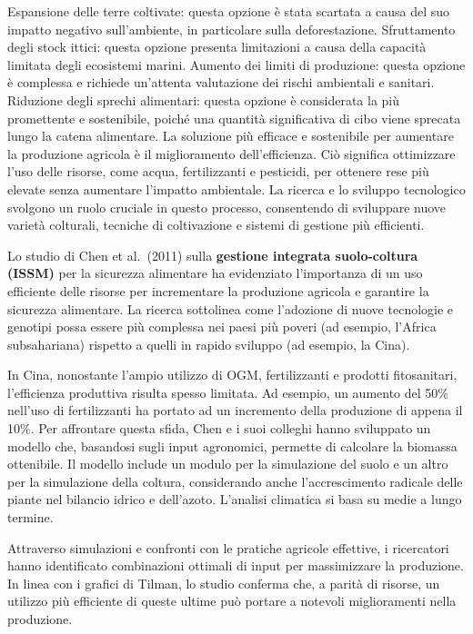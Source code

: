 \documentclass[
]{book}
\theoremstyle{definition}
\theoremstyle{definition}
\theoremstyle{definition}
\theoremstyle{definition}
\theoremstyle{remark}
\begin{document}
Espansione delle terre coltivate: questa opzione è stata scartata a causa del suo impatto negativo sull'ambiente, in particolare sulla deforestazione. Sfruttamento degli stock ittici: questa opzione presenta limitazioni a causa della capacità limitata degli ecosistemi marini. Aumento dei limiti di produzione: questa opzione è complessa e richiede un'attenta valutazione dei rischi ambientali e sanitari. Riduzione degli sprechi alimentari: questa opzione è considerata la più promettente e sostenibile, poiché una quantità significativa di cibo viene sprecata lungo la catena alimentare. La soluzione più efficace e sostenibile per aumentare la produzione agricola è il miglioramento dell'efficienza. Ciò significa ottimizzare l'uso delle risorse, come acqua, fertilizzanti e pesticidi, per ottenere rese più elevate senza aumentare l'impatto ambientale. La ricerca e lo sviluppo tecnologico svolgono un ruolo cruciale in questo processo, consentendo di sviluppare nuove varietà colturali, tecniche di coltivazione e sistemi di gestione più efficienti.

Lo studio di Chen et al.~(2011) sulla \textbf{gestione integrata suolo-coltura (ISSM)} per la sicurezza alimentare ha evidenziato l'importanza di un uso efficiente delle risorse per incrementare la produzione agricola e garantire la sicurezza alimentare. La ricerca sottolinea come l'adozione di nuove tecnologie e genotipi possa essere più complessa nei paesi più poveri (ad esempio, l'Africa subsahariana) rispetto a quelli in rapido sviluppo (ad esempio, la Cina).

In Cina, nonostante l'ampio utilizzo di OGM, fertilizzanti e prodotti fitosanitari, l'efficienza produttiva risulta spesso limitata. Ad esempio, un aumento del 50\% nell'uso di fertilizzanti ha portato ad un incremento della produzione di appena il 10\%. Per affrontare questa sfida, Chen e i suoi colleghi hanno sviluppato un modello che, basandosi sugli input agronomici, permette di calcolare la biomassa ottenibile. Il modello include un modulo per la simulazione del suolo e un altro per la simulazione della coltura, considerando anche l'accrescimento radicale delle piante nel bilancio idrico e dell'azoto. L'analisi climatica si basa su medie a lungo termine.

Attraverso simulazioni e confronti con le pratiche agricole effettive, i ricercatori hanno identificato combinazioni ottimali di input per massimizzare la produzione. In linea con i grafici di Tilman, lo studio conferma che, a parità di risorse, un utilizzo più efficiente di queste ultime può portare a notevoli miglioramenti nella produzione.
\end{document}
